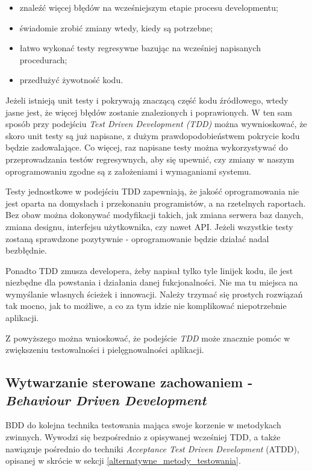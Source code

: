 \begin{itemize}
\item znaleźć więcej błędów na wcześniejszym etapie procesu developmentu;
\item świadomie zrobić zmiany wtedy, kiedy są potrzebne;
\item łatwo wykonać testy regresywne bazując na wcześniej napisanych procedurach;
\item przedłużyć żywotność kodu.
\end{itemize}

Jeżeli istnieją unit testy i pokrywają znaczącą część kodu źródłowego, wtedy jasne jest, że więcej błędów zostanie znalezionych i poprawionych. W ten sam sposób przy podejściu \textit{Test Driven Development (TDD)} można wywnioskować, że skoro unit testy są już napisane, z dużym prawdopodobieństwem pokrycie kodu będzie zadowalające. Co więcej, raz napisane testy można wykorzystywać do przeprowadzania testów regresywnych, aby się upewnić, czy zmiany w naszym oprogramowaniu zgodne są z założeniami i wymaganiami systemu.

Testy jednostkowe w podejściu TDD zapewniają, że jakość oprogramowania nie jest oparta na domysłach i przekonaniu programistów, a na rzetelnych raportach. Bez obaw można dokonywać modyfikacji takich, jak zmiana serwera baz danych, zmiana designu, interfejsu użytkownika, czy nawet API. Jeżeli wszystkie testy zostaną sprawdzone pozytywnie - oprogramowanie będzie działać nadal bezbłędnie.

Ponadto TDD zmusza developera, żeby napisał tylko tyle linijek kodu, ile jest niezbędne dla powstania i działania danej fukcjonalności. Nie ma tu miejsca na wymyślanie własnych ścieżek i innowacji. Należy trzymać się prostych rozwiązań tak mocno, jak to możliwe, a co za tym idzie nie komplikować niepotrzebnie aplikacji.

Z powyższego można wnioskować, że podejście \textit{TDD} może znacznie pomóc w zwiększeniu testowalności i pielęgnowalności aplikacji. 

\subsection{Wytwarzanie sterowane zachowaniem - \textit{Behaviour Driven Development}}
\label{behaviour_driven_development}
BDD do kolejna technika testowania mająca swoje korzenie w metodykach zwinnych. Wywodzi się bezpośrednio z opisywanej wcześniej TDD, a także  nawiązuje pośrednio do techniki \textit{Acceptance Test Driven Development} (ATDD), opisanej w skrócie w sekcji \ref{alternatywne_metody_testowania}.

